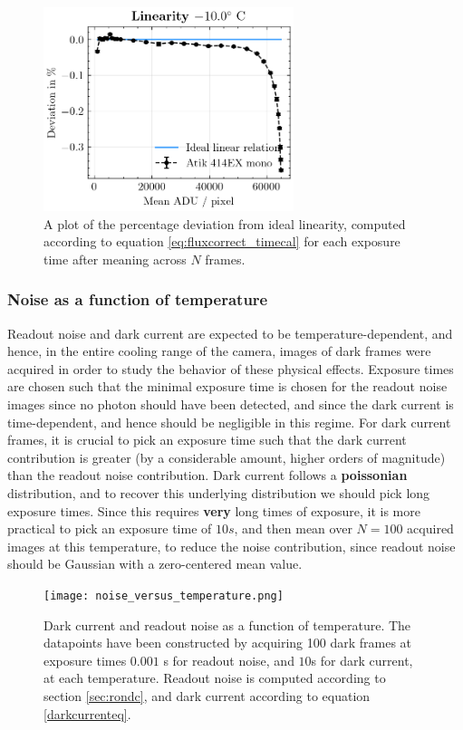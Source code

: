 \documentclass[../main.tex]{subfiles}
\begin{document}
		\begin{figure}
			\centering			\includegraphics[width=0.65\textwidth]{linearity.png}
			\caption{A plot of the percentage deviation from ideal linearity, computed according to equation  \ref{eq:fluxcorrect_timecal} for each exposure time after meaning across $N$ frames. }
			\label{fig:linearity}
		\end{figure}
		
		\subsubsection{Noise as a function of temperature}
		Readout noise and dark current are expected to be temperature-dependent, and hence, in the entire cooling range of the camera,  images of dark frames were acquired in order to study the behavior of these physical effects. Exposure times are chosen such that the minimal exposure time is chosen for the readout noise images since no photon should have been detected, and since the dark current is time-dependent, and hence should be negligible in this regime. For dark current frames, it is crucial to pick an exposure time such that the dark current contribution is greater (by a considerable amount, higher orders of magnitude) than the readout noise contribution. Dark current follows a \textbf{poissonian} distribution, and to recover this underlying distribution we should pick long exposure times. Since this requires \textbf{very} long times of exposure, it is more practical to pick an exposure time of $10s$, and then mean over $N = 100$ acquired images at this temperature, to reduce the noise contribution, since readout noise should be Gaussian with a zero-centered mean value. 
		
		\begin{figure}
			\centering			\texttt{[image: noise\_versus\_temperature.png]}
			\caption{Dark current and readout noise as a function of temperature. The datapoints have been constructed by acquiring 100 dark frames at exposure times $0.001$ s for readout noise, and $10$s for dark current, at each temperature. Readout noise is computed according to section \ref{sec:rondc}, and dark current according to equation \ref{darkcurrenteq}. }
			\label{fig:noise}
		\end{figure}
		
\end{document}
